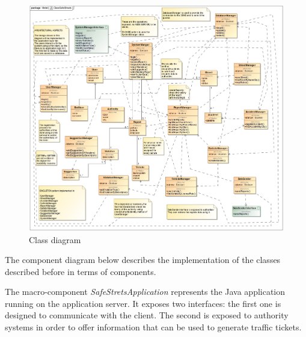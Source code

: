 \begin{figure}[H]
	\centering
	\includegraphics[width=1.12\linewidth]{Images/ClassSafeStreets.png}
	\caption{Class diagram}
\end{figure}

The component diagram below describes the implementation of the classes described before in terms of components.

The macro-component \textit{SafeStretsApplication} represents the Java application running on the application server. It exposes two interfaces: the first one is designed to communicate with the client. The second is exposed to authority systems in order to offer information that can be used to generate traffic tickets.

